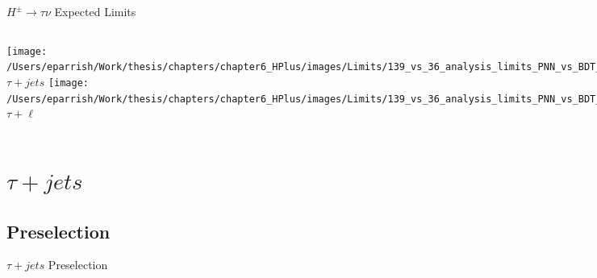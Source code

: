 \documentclass[aspectratio=169,xcolor=table]{beamer}
\begin{document}
  \begin{frame}{$H^{\pm} \rightarrow \tau\nu$ Expected Limits}
    \centering
    \small
    \begin{columns}
      \texttt{[image: /Users/eparrish/Work/thesis/chapters/chapter6\_HPlus/images/Limits/139\_vs\_36\_analysis\_limits\_PNN\_vs\_BDT\_TauJets\_logx.png]} \\
      \centering
      $\tau+jets$
      \texttt{[image: /Users/eparrish/Work/thesis/chapters/chapter6\_HPlus/images/Limits/139\_vs\_36\_analysis\_limits\_PNN\_vs\_BDT\_TauLep\_logx.png]} \\
      \centering
      $\tau+\ell$
    \end{columns}
  \end{frame}

\section{$\tau+jets$ }

  \subsection{Preselection}

    \begin{frame}[c]{$\tau+jets$ Preselection}
      \begin{table}
        \footnotesize
      \end{table}
    \end{frame}
\end{document}
